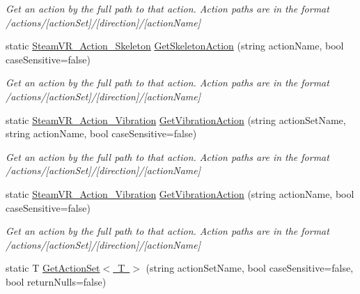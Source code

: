 \begin{DoxyCompactItemize}
\begin{DoxyCompactList}\small\item\em Get an action by the full path to that action. Action paths are in the format /actions/\mbox{[}action\+Set\mbox{]}/\mbox{[}direction\mbox{]}/\mbox{[}action\+Name\mbox{]} \end{DoxyCompactList}\item 
static \mbox{\hyperlink{class_valve_1_1_v_r_1_1_steam_v_r___action___skeleton}{Steam\+V\+R\+\_\+\+Action\+\_\+\+Skeleton}} \mbox{\hyperlink{class_valve_1_1_v_r_1_1_steam_v_r___input_a55798ec9f2be11a482869809b315e825}{Get\+Skeleton\+Action}} (string action\+Name, bool case\+Sensitive=false)
\begin{DoxyCompactList}\small\item\em Get an action by the full path to that action. Action paths are in the format /actions/\mbox{[}action\+Set\mbox{]}/\mbox{[}direction\mbox{]}/\mbox{[}action\+Name\mbox{]} \end{DoxyCompactList}\item 
static \mbox{\hyperlink{class_valve_1_1_v_r_1_1_steam_v_r___action___vibration}{Steam\+V\+R\+\_\+\+Action\+\_\+\+Vibration}} \mbox{\hyperlink{class_valve_1_1_v_r_1_1_steam_v_r___input_addb242c75f24ea3622e5960a74d345ee}{Get\+Vibration\+Action}} (string action\+Set\+Name, string action\+Name, bool case\+Sensitive=false)
\begin{DoxyCompactList}\small\item\em Get an action by the full path to that action. Action paths are in the format /actions/\mbox{[}action\+Set\mbox{]}/\mbox{[}direction\mbox{]}/\mbox{[}action\+Name\mbox{]} \end{DoxyCompactList}\item 
static \mbox{\hyperlink{class_valve_1_1_v_r_1_1_steam_v_r___action___vibration}{Steam\+V\+R\+\_\+\+Action\+\_\+\+Vibration}} \mbox{\hyperlink{class_valve_1_1_v_r_1_1_steam_v_r___input_a9ebbd824b3b2e03863a1227dd875ea02}{Get\+Vibration\+Action}} (string action\+Name, bool case\+Sensitive=false)
\begin{DoxyCompactList}\small\item\em Get an action by the full path to that action. Action paths are in the format /actions/\mbox{[}action\+Set\mbox{]}/\mbox{[}direction\mbox{]}/\mbox{[}action\+Name\mbox{]} \end{DoxyCompactList}\item 
static T \mbox{\hyperlink{class_valve_1_1_v_r_1_1_steam_v_r___input_a8c97236e06841de3c07e5685aa875359}{Get\+Action\+Set$<$ T $>$}} (string action\+Set\+Name, bool case\+Sensitive=false, bool return\+Nulls=false)

\end{DoxyCompactItemize}
